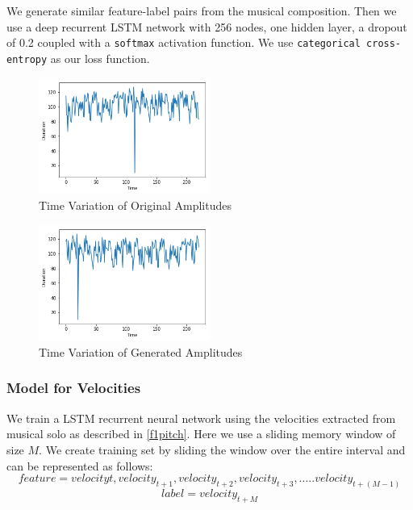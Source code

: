 \documentclass[conference]{IEEEtran}
\begin{document}
We generate similar feature-label pairs from the musical composition. Then we use a deep recurrent LSTM network with 256 nodes, one hidden layer, a dropout of 0.2 coupled with a \texttt{softmax} activation function. We use \texttt{categorical cross-entropy} as our loss function.\\

\begin{figure}[h]
\includegraphics[width=0.5\textwidth]{IEEEtran/amp_o.png}
\caption{Time Variation of Original Amplitudes}
\label{fig:figure3}
\end{figure}

\begin{figure}[h]
\includegraphics[width=0.5\textwidth]{IEEEtran/amp_g.png}
\caption{Time Variation of Generated Amplitudes}
\label{fig:figure4}
\end{figure}

\subsubsection{Model for Velocities}
We train a LSTM recurrent neural network using the velocities extracted from musical solo as described in \ref{f1pitch}. Here we use a sliding memory window of size $M$. We create training set by sliding the window over the entire interval and can be represented as follows:
$$feature = {velocity{t},velocity_{t+1},velocity_{t+2},velocity_{t+3},.....velocity_{t+(M-1)}}$$
$$label = {velocity_{t+M}}$$
\end{document}
